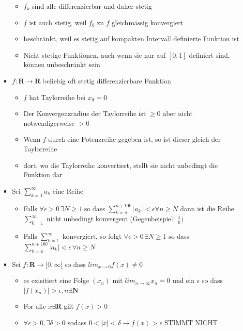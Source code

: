 \documentclass[8pt]{extarticle}
\begin{document}
\begin{multicols*}{3}
\begin{itemize}
\begin{itemize}
 \item $f_k$ sind alle differenzierbar und daher stetig
 \item $f$ ist auch stetig, weil $f_k$ zu $f$ gleichmässig konvergiert
 \item beschränkt, weil es stetig auf kompakten Intervall definierte Funktion ist
 \item \color{red} Nicht stetige Funktionen, auch wenn sie nur auf $[0, 1]$ definiert sind, können unbeschränkt sein
\end{itemize}
 \item $f: \mathbf{R} \rightarrow \mathbf{R}$ beliebig oft stetig differenzierbare Funktion
\begin{itemize}
 \item $f$ hat Taylorreihe bei $x_0 = 0$
 \item Der Konvergenzradius der Taylorreihe ist $\geq0$ aber nicht notwendigerweise $>0$
 \item Wenn $f$ durch eine Potenzreihe gegeben ist, so ist dieser gleich der Taylorreihe \color{red}
 \item  dort, wo die Taylorreihe konvertiert, stellt sie nicht unbedingt die Funktion dar
\end{itemize}
 \item Sei $\sum_{k = 1}^{\infty} a_k$ eine Reihe
\begin{itemize}
\color{red}
 \item Falls $\forall \epsilon > 0 \, \exists N \geq 1$ so dass $\sum_{k = n}^{n + 100} |a_k| < \epsilon \forall n \geq N $ dann ist die Reihe $\sum_{k = 1}^{\infty}$ nicht unbedingt konvergent (Gegenbeispiel: $\frac{1}{n})$ \color{black}
 \item  Falls $\sum_{k = 1}^{\infty}$ konvergiert, so folgt $\forall \epsilon > 0 \, \exists N \geq1$ so dass  $\sum_{k = n}^{n + 100} |a_k| < \epsilon \, \forall n \geq N$
\end{itemize}
 \item Sei $f: \mathbf{R} \rightarrow [0, \infty[$ so dass $lim_{x \to 0} f(x) \neq 0$
\begin{itemize}
 \item es exisitiert eine Folge $(x_n)$ mit $lim_{n \to \infty} x_n = 0$ und ein $\epsilon$ so dass $|f(x_n)| > \epsilon, n \exists \mathbf{N}$
 \item For alle $x \exists \mathbf{R}$ gilt $f(x) > 0$ \color{red}
 \item  $\forall \epsilon > 0, \exists  \delta > 0$ sodass $0 < |x| < \delta \rightarrow f(x) > \epsilon$ STIMMT NICHT

\end{itemize}
\end{itemize}
\end{multicols*}
\end{document}
